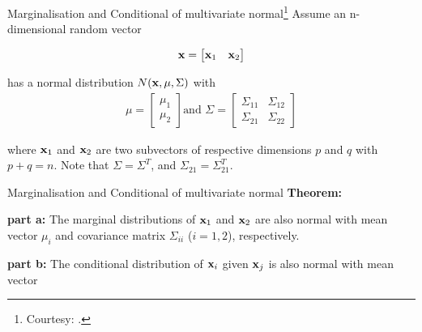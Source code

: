 \documentclass{beamer}
\begin{document}
\begin{frame}{Marginalisation and Conditional of multivariate normal\footnote{Courtesy: \nodeSeven.}}
	Assume an n-dimensional random vector
	
	\begin{equation}
	{\bf x}=\begin{bmatrix}\mathbf{x}_1 & \mathbf{x}_2\end{bmatrix} 
	\end{equation}
	
	has a normal distribution $N({\bf x},\mu,\Sigma)$ with
	\begin{gather}\mu=
	\begin{bmatrix}
	\mu_1 \\
	\mu_2
	\end{bmatrix} 
	\text{and }
	\Sigma = \begin{bmatrix}
	\Sigma_{11}& \Sigma_{12}\\
	\Sigma_{21}&\Sigma_{22}
	\end{bmatrix} 
	\end{gather}
	
	where $\mathbf{x}_1$ and $\mathbf{x}_2$ are two subvectors of respective dimensions $p$ and $q$ with $p+q=n$. Note that $\Sigma=\Sigma^T$, and $\Sigma_{21}=\Sigma_{21}^T$.
\end{frame}

\begin{frame}{Marginalisation and Conditional of multivariate normal}
	\textbf{Theorem:}
	
	\textbf{part a:} The marginal distributions of $\mathbf{x}_1$ and $\mathbf{x}_2$ are also normal with mean vector $\mu_i$ and covariance matrix $\Sigma_{ii}$ ($i=1,2$), respectively.
	
	\textbf{part b:} The conditional distribution of ${\bf x}_i$ given ${\bf x}_j$ is also normal with mean vector
	
\end{frame}
\end{document}

